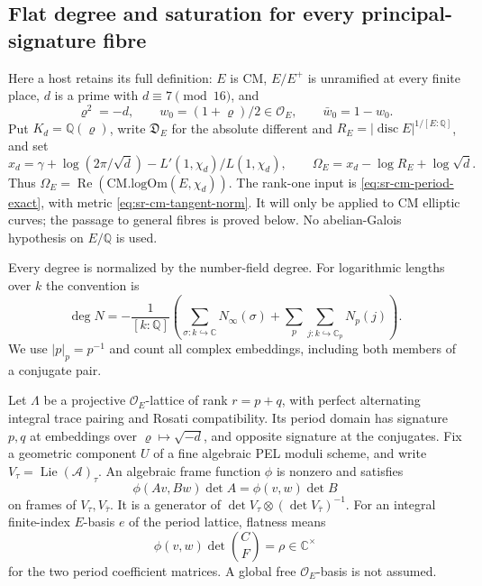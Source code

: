 \subsection{Flat degree and saturation for every principal-signature fibre}
\label{subsec:sr-general-flat-degree-saturation}

Here a host retains its full definition: \(E\) is CM,
\(E/E^+\) is unramified at every finite place, \(d\) is a prime
with \(d\equiv7\pmod {16}\), and
\[
 \varrho^2=-d,\qquad w_0=(1+\varrho)/2\in\mathcal O_E,\qquad
 \bar w_0=1-w_0.
 \tag{FD1}
\]
Put \(K_d=\mathbb Q(\varrho)\), write \(\mathfrak D_E\) for the
absolute different and \(R_E=|\operatorname{disc}E|^{1/[E:\mathbb Q]}\),
and set
\[
 x_d=\gamma+\log(2\pi/\sqrt d)-L'(1,\chi_d)/L(1,\chi_d),\qquad
 \Omega_E=x_d-\log R_E+\log\sqrt d .
 \tag{FD2}
\]
Thus \(\Omega_E=\operatorname{Re}(\mathrm{CM.logOm}(E,\chi_d))\).
The rank-one input is \eqref{eq:sr-cm-period-exact}, with metric
\eqref{eq:sr-cm-tangent-norm}.  It will only be applied to CM
elliptic curves; the passage to general fibres is proved below.
No abelian-Galois hypothesis on \(E/\mathbb Q\) is used.

Every degree is normalized by the number-field degree.
For logarithmic lengths over \(k\) the convention is
\[
 \deg N=-\frac1{[k:\mathbb Q]}
 \left(\sum_{\sigma:k\hookrightarrow\mathbb C}N_\infty(\sigma)
       +\sum_p\sum_{j:k\hookrightarrow\mathbb C_p}N_p(j)\right).
 \tag{FD3}
\]
We use \(|p|_p=p^{-1}\) and count all complex embeddings,
including both members of a conjugate pair.

Let \(\Lambda\) be a projective \(\mathcal O_E\)-lattice of rank
\(r=p+q\), with perfect alternating integral trace pairing and
Rosati compatibility.  Its period domain has signature \(p,q\)
at embeddings over \(\varrho\mapsto\sqrt{-d}\), and opposite
signature at the conjugates.  Fix a geometric component \(U\)
of a fine algebraic PEL moduli scheme, and write
\(V_\tau=\operatorname{Lie}(\mathcal A)_\tau\).
An algebraic frame function \(\phi\) is nonzero and satisfies
\[
                  \phi(Av,Bw)\det A=\phi(v,w)\det B
 \tag{FD4}
\]
on frames of \(V_\tau,V_{\bar\tau}\).
It is a generator of
\(\det V_\tau\otimes(\det V_{\bar\tau})^{-1}\).
For an integral finite-index \(E\)-basis \(e\) of the period
lattice, flatness means
\[
                   \phi(v,w)\det\binom C F=\rho\in\mathbb C^\times
 \tag{FD5}
\]
for the two period coefficient matrices.  A global free
\(\mathcal O_E\)-basis is not assumed.

